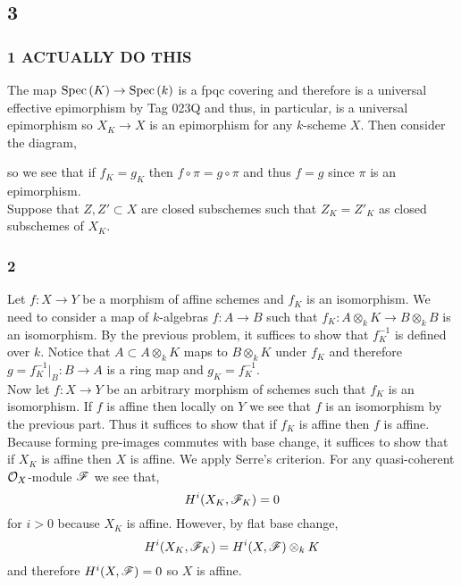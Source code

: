 \documentclass[12pt]{article}
\begin{document}
\subsection{3}

\subsubsection{1 ACTUALLY DO THIS}

The map $\mathrm{Spec}\left( K \right) \to \mathrm{Spec}\left( k \right)$ is a fpqc covering and therefore is a universal effective epimorphism by Tag 023Q and thus, in particular, is a universal epimorphism so $X_K \to X$ is an epimorphism for any $k$-scheme $X$. Then consider the diagram,
\begin{center}
\end{center}
so we see that if $f_K = g_K$ then $f \circ \pi =  g \circ \pi$ and thus $f = g$ since $\pi$ is an epimorphism.
\bigskip\\
Suppose that $Z, Z' \subset X$ are closed subschemes such that $Z_K = Z'_K$ as closed subschemes of $X_K$. 

\subsubsection{2}

Let $f : X \to Y$ be a morphism of affine schemes and $f_K$ is an isomorphism. We need to consider a map of $k$-algebras $f : A \to B$ such that $f_K : A \otimes_k K \to B \otimes_k B$ is an isomorphism. By the previous problem, it suffices to show that $f_K^{-1}$ is defined over $k$. Notice that $A \subset A \otimes_k K$ maps to $B \otimes_k K$ under $f_K$ and therefore $g = f_K^{-1}|_B : B \to A$ is a ring map and $g_K = f_K^{-1}$. 
\bigskip\\
Now let $f : X \to Y$ be an arbitrary morphism of schemes such that $f_K$ is an isomorphism. If $f$ is affine then locally on $Y$ we see that $f$ is an isomorphism by the previous part. Thus it suffices to show that if $f_K$ is affine then $f$ is affine. Because forming pre-images commutes with base change, it suffices to show that if $X_K$ is affine then $X$ is affine. We apply Serre's criterion. For any quasi-coherent $\mathcal{O}_{X}$-module $\mathscr{F}$ we see that,
\[ H^i(X_K, \mathscr{F}_K) = 0 \]
for $i > 0$ because $X_K$ is affine. However, by flat base change,
\[ H^i(X_K, \mathscr{F}_K) = H^i(X, \mathscr{F}) \otimes_k K \]
and therefore $H^i(X, \mathscr{F}) = 0$ so $X$ is affine. 
\end{document}
